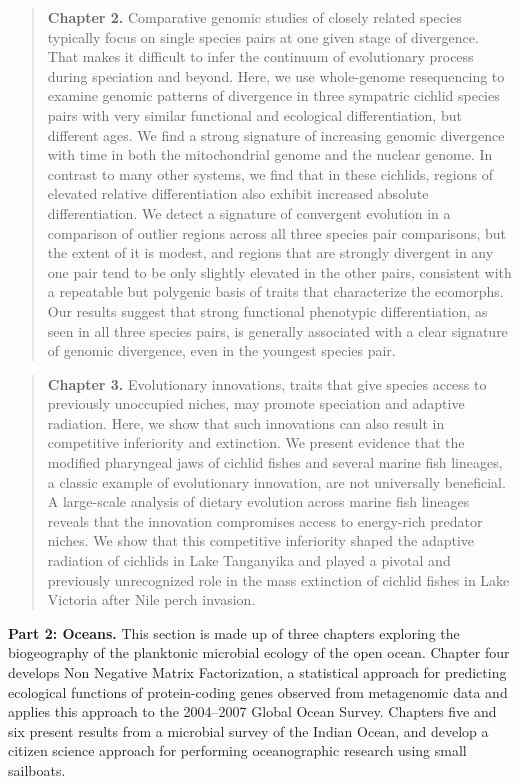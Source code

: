 \begin{quote}
\noindent\textbf{Chapter 2.} Comparative genomic studies of closely related species typically focus on single species pairs at one given stage of divergence. That makes it difficult to infer the continuum of evolutionary process during speciation and beyond. Here, we use whole-genome resequencing to examine genomic patterns of divergence in three sympatric cichlid species pairs with very similar functional and ecological differentiation, but different ages. We find a strong signature of increasing genomic divergence with time in both the mitochondrial genome and the nuclear genome. In contrast to many other systems, we find that in these cichlids, regions of elevated relative differentiation also exhibit increased absolute differentiation. We detect a signature of convergent evolution in a comparison of outlier regions across all three species pair comparisons, but the extent of it is modest, and regions that are strongly divergent in any one pair tend to be only slightly elevated in the other pairs, consistent with a repeatable but polygenic basis of traits that characterize the ecomorphs. Our results suggest that strong functional phenotypic differentiation, as seen in all three species pairs, is generally associated with a clear signature of genomic divergence, even in the youngest species pair.
\end{quote}

\begin{quote} \noindent\textbf{Chapter 3.} Evolutionary innovations, traits
that give species access to previously unoccupied niches, may promote
speciation and adaptive radiation. Here, we show that such innovations can
also result in competitive inferiority and extinction. We present evidence
that the modified pharyngeal jaws of cichlid fishes and several marine fish
lineages, a classic example of evolutionary innovation, are not universally
beneficial. A large-scale analysis of dietary evolution across marine fish
lineages reveals that the innovation compromises access to energy-rich
predator niches. We show that this competitive inferiority shaped the adaptive
radiation of cichlids in Lake Tanganyika and played a pivotal and previously
unrecognized role in the mass extinction of cichlid fishes in Lake Victoria
after Nile perch invasion. \end{quote}

\noindent\textbf{Part 2: Oceans.}
This section is made up of three chapters exploring the biogeography of the planktonic microbial ecology of the open ocean. Chapter four develops Non Negative Matrix Factorization, a statistical approach for predicting ecological functions of protein-coding genes observed from metagenomic data and applies this approach to the 2004--2007 Global Ocean Survey. \cite{jiang2012functional} Chapters five and six present results from a microbial survey of the Indian Ocean, and develop a citizen science approach for performing oceanographic research using small sailboats. \cite{jeffries2015spatially, lauro2014common}

